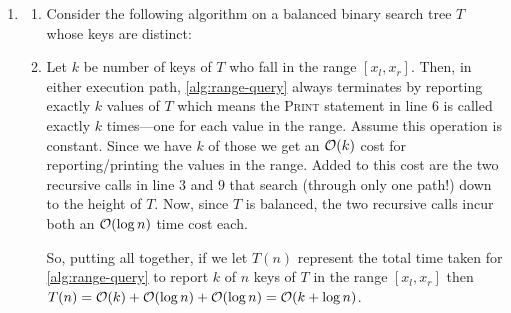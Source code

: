 \documentclass{article}
\begin{document}
\begin{enumerate}[leftmargin={*}, font={\bf}, label={\arabic*.}, ref={\arabic*}]
  \item \label{qst:3}
    \begin{enumerate}
      \item \label{qst:3a}
        Consider the following algorithm on a balanced binary search tree $T$ whose keys are distinct:
        \vspace{-\baselineskip}
        
        \begin{minipage}{\linewidth}
          \begin{algorithm}[H]
            \caption{$\textsc{Range-Query}(v,x_l,x_r)$}\label{alg:range-query}
            \begin{algorithmic}[1]
                  \State {} 
                \EndIf
                  \State {}
                \EndIf
                  \State {} 
                \EndIf
              \EndIf
            \end{algorithmic}
          \end{algorithm}
        \end{minipage}

      \item \label{qst:3b}
        Let $k$ be number of keys of $T$ who fall in the range $[x_l, x_r]$. Then, in either
        execution path, \autoref{alg:range-query} always terminates by reporting exactly $k$
        values of $T$ which means the \textsc{Print} statement in line $6$ is called exactly
        $k$ times---one for each value in the range. Assume this operation is constant. Since
        we have $k$ of those we get an $\operatorname*{\mathcal{O}}(k)$ cost for reporting/printing the values in the
        range. Added to this cost are the two recursive calls in line $3$ and $9$ that search
        (through only one path!) down to the height of $T$. Now, since $T$ is balanced, the
        two recursive calls incur both an $\operatorname*{\mathcal{O}}(\log n)$ time cost each.

        So, putting all together, if we let $T(n)$ represent the total time taken for
        \autoref{alg:range-query} to report $k$ of $n$ keys of $T$ in the range $[x_l, x_r]$
        then $T(n) = \operatorname*{\mathcal{O}}(k) + \operatorname*{\mathcal{O}}(\log n) + \operatorname*{\mathcal{O}}( \log n) = \operatorname*{\mathcal{O}}(k + \log n)$.
    \end{enumerate}


\end{enumerate}
\end{document}
